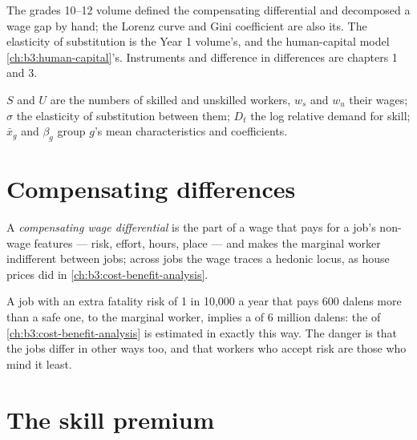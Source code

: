 \begin{recall}
The grades 10--12 volume defined the compensating differential and decomposed a
wage gap by hand; the Lorenz curve and Gini coefficient are also its. The
elasticity of substitution is the Year 1 volume's, and the human-capital model
\cref{ch:b3:human-capital}'s. Instruments and difference in differences are
chapters 1 and 3.
\end{recall}

\begin{notation}\label{not:b3:wage-structure:symbols}
$S$ and $U$ are the numbers of skilled and unskilled workers, $w_s$ and $w_u$ their wages; $\sigma$
the elasticity of substitution between them; $D_t$ the log relative demand for skill;
$\bar x_g$ and $\beta_g$ group $g$'s mean characteristics and coefficients.
\end{notation}

\section{Compensating differences}\label{sec:b3:wage-structure:compensating}

\begin{definition}\label{def:b3:wage-structure:compensating}
A \emph{compensating wage differential} is the part of a wage that pays for a job's
non-wage features --- risk, effort, hours, place --- and makes the marginal worker
indifferent between jobs; across jobs the wage traces a hedonic locus, as house
prices did in \cref{ch:b3:cost-benefit-analysis}.
\end{definition}

A job with an extra fatality risk of 1 in 10{,}000 a year that pays 600 dalens more than a
safe one, to the marginal worker, implies a  of 6 million
dalens: the  of \cref{ch:b3:cost-benefit-analysis} is estimated in exactly this way.
The danger is that the jobs differ in other ways too, and that workers who accept
risk are those who mind it least.

\section{The skill premium}\label{sec:b3:wage-structure:premium}

